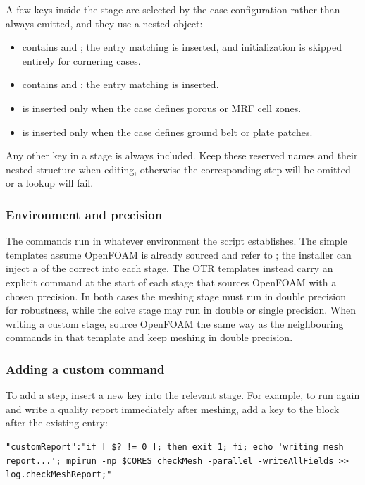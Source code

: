 A few keys inside the  stage are selected by the case configuration rather than always emitted, and they use a nested object:
\begin{itemize}
    \item {} contains  and ; the entry matching  is inserted, and initialization is skipped entirely for cornering cases.
    \item {} contains  and ; the entry matching  is inserted.
    \item {} is inserted only when the case defines porous or MRF cell zones.
    \item {} is inserted only when the case defines ground belt or plate patches.
\end{itemize}

Any other key in a stage is always included. Keep these reserved names and their nested structure when editing, otherwise the corresponding step will be omitted or a lookup will fail.

\subsubsection{Environment and precision}

The commands run in whatever environment the script establishes. The simple templates assume OpenFOAM is already sourced and refer to ; the installer can inject a  of the correct  into each stage. The OTR templates instead carry an explicit  command at the start of each stage that sources OpenFOAM with a chosen precision. In both cases the meshing stage must run in double precision for  robustness, while the solve stage may run in double or single precision. When writing a custom stage, source OpenFOAM the same way as the neighbouring commands in that template and keep meshing in double precision.

\subsubsection{Adding a custom command}

To add a step, insert a new key into the relevant stage. For example, to run  again and write a quality report immediately after meshing, add a key to the  block after the existing  entry:
\begin{lstlisting}
"customReport":"if [ $? != 0 ]; then exit 1; fi; echo 'writing mesh report...'; mpirun -np $CORES checkMesh -parallel -writeAllFields >> log.checkMeshReport;"
\end{lstlisting}

